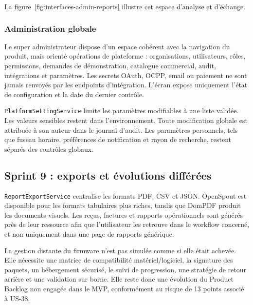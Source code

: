 La figure~\ref{fig:interfaces-admin-reports} illustre cet espace d'analyse et
d'échange.

\subsubsection{Administration globale}

Le super administrateur dispose d'un espace cohérent avec la navigation du
produit, mais orienté opérations de plateforme : organisations, utilisateurs,
rôles, permissions, demandes de démonstration, catalogue commercial, audit,
intégrations et paramètres. Les secrets OAuth, OCPP, email ou paiement ne sont
jamais renvoyés par les endpoints d'intégration. L'écran expose uniquement l'état
de configuration et la date du dernier contrôle.

\texttt{PlatformSettingService} limite les paramètres modifiables à une liste
validée. Les valeurs sensibles restent dans l'environnement. Toute modification
globale est attribuée à son auteur dans le journal d'audit. Les paramètres
personnels, tels que fuseau horaire, préférences de notification et rayon de
recherche, restent séparés des contrôles globaux.

\subsection{Sprint 9 : exports et évolutions différées}

\texttt{ReportExportService} centralise les formats PDF, CSV et JSON. OpenSpout est
disponible pour les formats tabulaires plus riches, tandis que DomPDF produit les
documents visuels. Les reçus, factures et rapports opérationnels sont générés près
de leur ressource afin que l'utilisateur les retrouve dans le workflow concerné,
et non uniquement dans une page de rapports générique.

La gestion distante du firmware n'est pas simulée comme si elle était achevée.
Elle nécessite une matrice de compatibilité matériel/logiciel, la signature des
paquets, un hébergement sécurisé, le suivi de progression, une stratégie de
retour arrière et une validation sur borne. Elle reste donc une évolution du
Product Backlog non engagée dans le MVP, conformément au risque de 13 points
associé à US-38.
